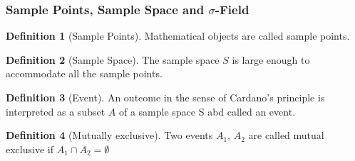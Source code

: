 \documentclass{article}
\theoremstyle{definition}
\newtheorem{definition}{Definition}[subsection]
\begin{document}
\subsubsection{Sample Points, Sample Space and $\sigma$-Field }
\begin{definition}[Sample Points]
    Mathematical objects are called sample points.
\end{definition}
\begin{definition}[Sample Space]
    The sample space $S$ is large enough to accommodate all the sample points.
\end{definition}
\begin{definition}[Event]
    An outcome in the sense of Cardano's principle is interpreted as a subset $A$ of a sample space S abd called an event.
\end{definition}
\begin{definition}[Mutually exclusive]
    Two events $A_1$, $A_2$ are called mutual exclusive if $A_1\cap A_2=\emptyset$
\end{definition}
\end{document}
